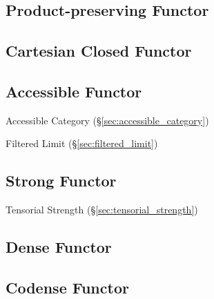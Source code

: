 \subsection{Product-preserving Functor}
\label{sec:product_preserving_functor}

\subsection{Cartesian Closed Functor}
\label{sec:cartesian_closed_functor}

\subsection{Accessible Functor}\label{sec:accessible_functor}

Accessible Category (\S\ref{sec:accessible_category})

Filtered Limit (\S\ref{sec:filtered_limit})



\subsection{Strong Functor}\label{sec:strong_functor}

Tensorial Strength (\S\ref{sec:tensorial_strength})



\subsection{Dense Functor}\label{sec:dense_functor}

\subsection{Codense Functor}\label{sec:codense_functor}

